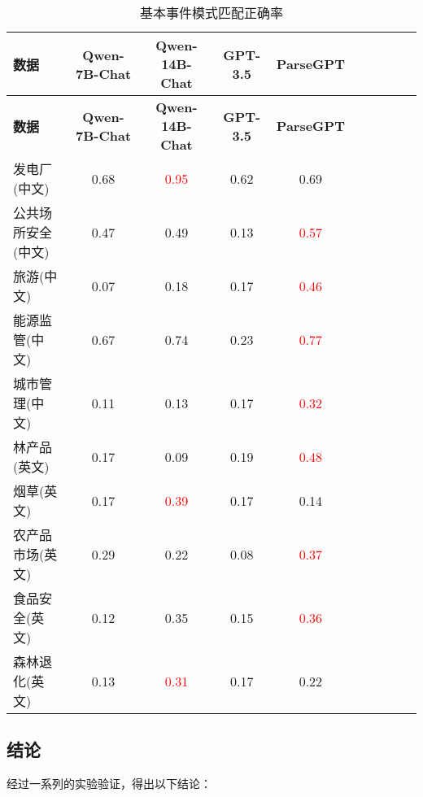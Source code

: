 \begin{longtable}{@{}lccccccccc@{}}
    \caption{基本事件模式匹配正确率} \label{tab:333} \\
    \toprule
    \textbf{数据} & \textbf{Qwen-7B-Chat} & \textbf{Qwen-14B-Chat} & \textbf{GPT-3.5} & \textbf{ParseGPT} \\ 
    \midrule
    \endfirsthead
    
    \toprule
    \textbf{数据} & \textbf{Qwen-7B-Chat} & \textbf{Qwen-14B-Chat} & \textbf{GPT-3.5} & \textbf{ParseGPT} \\ 
    \midrule
    \endhead
    
    \midrule
    \endfoot
    
    \bottomrule
    \endlastfoot
    
    发电厂(中文) & 0.68 & \textcolor{red}{0.95} & 0.62 & 0.69 \\
    公共场所安全(中文) & 0.47 & 0.49 & 0.13 & \textcolor{red}{0.57} \\
    旅游(中文) & 0.07 & 0.18 & 0.17 & \textcolor{red}{0.46} \\
    能源监管(中文) & 0.67 & 0.74 & 0.23 & \textcolor{red}{0.77} \\
    城市管理(中文) & 0.11 & 0.13 & 0.17 & \textcolor{red}{0.32} \\
    林产品(英文) & 0.17 & 0.09 & 0.19 & \textcolor{red}{0.48} \\
    烟草(英文) & 0.17 & \textcolor{red}{0.39} & 0.17 & 0.14 \\
    农产品市场(英文) & 0.29 & 0.22 & 0.08 & \textcolor{red}{0.37} \\
    食品安全(英文) & 0.12 & 0.35 & 0.15 & \textcolor{red}{0.36} \\
    森林退化(英文) & 0.13 & \textcolor{red}{0.31} & 0.17 & 0.22 \\
    
\end{longtable}

\subsection{结论}

经过一系列的实验验证，得出以下结论：

